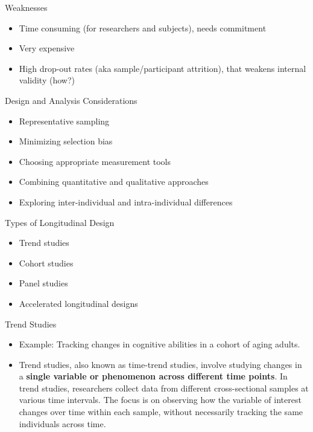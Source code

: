 \documentclass[
  ignorenonframetext,
  aspectratio=169,
]{beamer}
\providecommand{\tightlist}{%
  \setlength{\itemsep}{0pt}\setlength{\parskip}{0pt}}\usepackage{longtable,booktabs,array}
\begin{document}
\begin{frame}{Weaknesses}
\label{weaknesses}
\begin{itemize}[<+->]
\tightlist
\item
  Time consuming (for researchers and subjects), needs commitment
\item
  Very expensive
\item
  High drop-out rates (aka sample/participant attrition), that weakens
  internal validity (how?)
\end{itemize}
\end{frame}

\begin{frame}{Design and Analysis Considerations}
\label{design-and-analysis-considerations}
\begin{itemize}[<+->]
\tightlist
\item
  Representative sampling
\item
  Minimizing selection bias
\item
  Choosing appropriate measurement tools
\item
  Combining quantitative and qualitative approaches
\item
  Exploring inter-individual and intra-individual differences
\end{itemize}
\end{frame}

\begin{frame}{Types of Longitudinal Design}
\label{types-of-longitudinal-design}
\begin{itemize}
\tightlist
\item
  Trend studies
\item
  Cohort studies
\item
  Panel studies
\item
  Accelerated longitudinal designs
\end{itemize}
\end{frame}

\begin{frame}{Trend Studies}
\label{trend-studies}
\begin{itemize}[<+->]
\tightlist
\item
  Example: Tracking changes in cognitive abilities in a cohort of aging
  adults.
\item
  Trend studies, also known as time-trend studies, involve studying
  changes in a \textbf{single variable or phenomenon across different
  time points}. In trend studies, researchers collect data from
  different cross-sectional samples at various time intervals. The focus
  is on observing how the variable of interest changes over time within
  each sample, without necessarily tracking the same individuals across
  time.
\end{itemize}
\end{frame}
\end{document}
